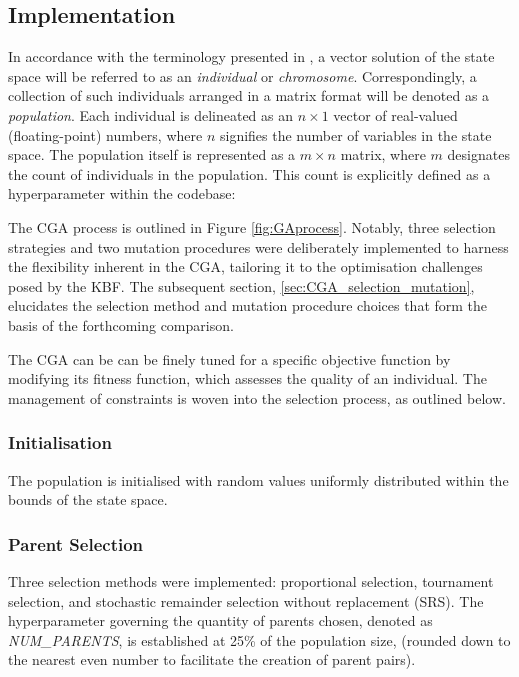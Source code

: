 \documentclass[10pt]{article}
\begin{document}
\begin{multicols}{2}
\subsection{Implementation}
\label{sec:CGA_implementation}

In accordance with the terminology presented in \cite{parks2023geneticalgorithms}, a vector solution of the state space will be referred to as an \textit{individual} or \textit{chromosome}. Correspondingly, a collection of such individuals arranged in a matrix format will be denoted as a \textit{population}. Each individual is delineated as an $n \times 1$ vector of real-valued (floating-point) numbers, where $n$ signifies the number of variables in the state space. The population itself is represented as a $m \times n$ matrix, where $m$ designates the count of individuals in the population. This count is explicitly defined as a hyperparameter within the codebase: %

The CGA process is outlined in Figure \ref{fig:GAprocess}. Notably, three selection strategies and two mutation procedures were deliberately implemented to harness the flexibility inherent in the CGA, tailoring it to the optimisation challenges posed by the KBF. The subsequent section, \ref{sec:CGA_selection_mutation}, elucidates the selection method and mutation procedure choices that form the basis of the forthcoming comparison.

The CGA can be can be finely tuned for a specific objective function by modifying its fitness function, which assesses the quality of an individual. The management of constraints is woven into the selection process, as outlined below.

\subsubsection{Initialisation}

The population is initialised with random values uniformly distributed within the bounds of the state space.

\subsubsection{Parent Selection}

Three selection methods were implemented: proportional selection, tournament selection, and stochastic remainder selection without replacement (SRS). The hyperparameter governing the quantity of parents chosen, denoted as \textit{NUM\_PARENTS}, is established at 25\% of the population size, (rounded down to the nearest even number to facilitate the creation of parent pairs).


\end{multicols}
\end{document}
